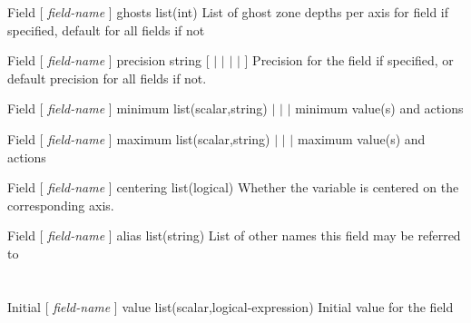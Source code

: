 \documentclass{book}
\begin{document}
\Parameter
{Field}
{[ \textit{field-name} ]} 
{ghosts}
{list(int)}
{}
{List of ghost zone depths per axis for field if specified, default for all fields if not}
{}
{}

\Parameter
{Field} 
{[ \textit{field-name} ]} 
{precision} 
{string} 
{[   
$|$  
$|$ 
$|$ 
$|$  ] } 
{Precision for the field if specified, or default precision for all fields if not.} 
{} 
{}

\Parameter
{Field}
{[ \textit{field-name} ]} 
{minimum}
{list(scalar,string)}
{ $|$  $|$  $|$ }
{minimum value(s) and actions }
{}
{}

\Parameter
{Field}
{[ \textit{field-name} ]} 
{maximum}
{list(scalar,string)}
{ $|$  $|$  $|$ }
{maximum value(s) and actions }
{}
{}

\Parameter
{Field}
{[ \textit{field-name} ]} 
{centering}
{list(logical)}
{}
{Whether the variable is centered on the corresponding axis.}
{}
{}

\Parameter
{Field}
{[ \textit{field-name} ]}
{alias}
{list(string)}
{}
{List of other names this field may be referred to}
{}
{}

\section{}

\Parameter
{Initial}
{[ \textit{field-name} ]}
{value}
{list(scalar,logical-expression)}
{}
{Initial value for the field}
{}
{}
\end{document}
